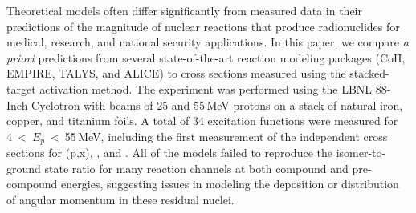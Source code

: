 


Theoretical models often differ significantly from measured data in their predictions of the magnitude of nuclear reactions that produce radionuclides for medical, research, and national security applications.
In this paper, we compare \emph{a priori} predictions from several state-of-the-art reaction modeling packages (CoH, EMPIRE, TALYS, and ALICE) to cross sections measured using the stacked-target activation method.  
The experiment was performed using the LBNL 88-Inch Cyclotron with beams of 25 and 55\,MeV protons on a stack of natural iron, copper, and titanium foils.  
A total of 34 excitation functions were measured for 4~\textless~$E_p$~\textless~55\,MeV, including the first measurement of the independent cross sections for (p,x), , and .  
All of the models failed to reproduce the isomer-to-ground state ratio for many  reaction channels at both compound and pre-compound energies, suggesting issues in modeling the deposition or distribution of angular momentum in these residual nuclei.  



